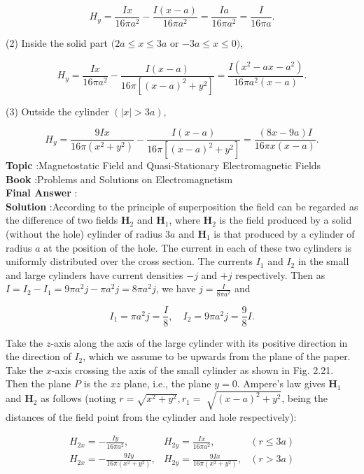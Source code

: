 \documentclass[10pt]{article}
\begin{document}
$$
H_{y}=\frac{I x}{16 \pi a^{2}}-\frac{I(x-a)}{16 \pi a^{2}}=\frac{I a}{16 \pi a^{2}}=\frac{I}{16 \pi a} .
$$

(2) Inside the solid part $(2 a \leq x \leq 3 a$ or $-3 a \leq x \leq 0)$,

$$
H_{y}=\frac{I x}{16 \pi a^{2}}-\frac{I(x-a)}{16 \pi\left[(x-a)^{2}+y^{2}\right]}=\frac{I\left(x^{2}-a x-a^{2}\right)}{16 \pi a^{2}(x-a)} .
$$

(3) Outside the cylinder $(|x|>3 a)$,

$$
H_{y}=\frac{9 I x}{16 \pi\left(x^{2}+y^{2}\right)}-\frac{I(x-a)}{16 \pi\left[(x-a)^{2}+y^{2}\right]}=\frac{(8 x-9 a) I}{16 \pi x(x-a)} .
$$
\textbf{Topic} :Magnetostatic Field and Quasi-Stationary Electromagnetic Fields\\
\textbf{Book} :Problems and Solutions on Electromagnetism\\
\textbf{Final Answer} :\\


\textbf{Solution} :According to the principle of superposition the field can be regarded as the difference of two fields $\mathbf{H}_{2}$ and $\mathbf{H}_{1}$, where $\mathbf{H}_{2}$ is the field produced by a solid (without the hole) cylinder of radius $3 a$ and $\mathbf{H}_{1}$ is that produced by a cylinder of radius $a$ at the position of the hole. The current in each of these two cylinders is uniformly distributed over the cross section. The currents $I_{1}$ and $I_{2}$ in the small and large cylinders have current densities $-j$ and $+j$ respectively. Then as $I=I_{2}-I_{1}=9 \pi a^{2} j-\pi a^{2} j=8 \pi a^{2} j$, we have $j=\frac{I}{8 \pi a^{2}}$ and

$$
I_{1}=\pi a^{2} j=\frac{I}{8}, \quad I_{2}=9 \pi a^{2} j=\frac{9}{8} I .
$$

Take the $z$-axis along the axis of the large cylinder with its positive direction in the direction of $I_{2}$, which we assume to be upwards from the plane of the paper. Take the $x$-axis crossing the axis of the small cylinder as shown in Fig. 2.21. Then the plane $P$ is the $x z$ plane, i.e., the plane $y=0$. Ampere's law gives $\mathbf{H}_{1}$ and $\mathbf{H}_{2}$ as follows (noting $r=\sqrt{x^{2}+y^{2}}, r_{1}=$ $\sqrt{(x-a)^{2}+y^{2}}$, being the distances of the field point from the cylinder and hole respectively):

$$
\begin{array}{lll}
H_{2 x}=-\frac{I y}{16 \pi a^{2}}, & H_{2 y}=\frac{I x}{16 \pi a^{2}}, & (r \leq 3 a) \\
H_{2 x}=-\frac{9 I y}{16 \pi\left(x^{2}+y^{2}\right)}, & H_{2 y}=\frac{9 I x}{16 \pi\left(x^{2}+y^{2}\right)}, & (r>3 a)
\end{array}
$$
\end{document}
